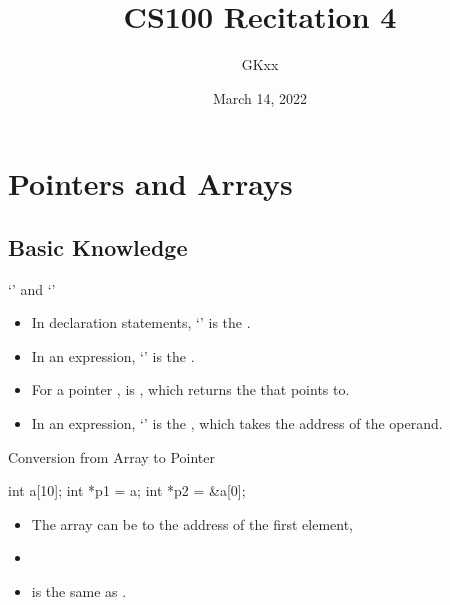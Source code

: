 \documentclass[handout]{beamer}
\title{CS100 Recitation 4}
\author{GKxx}
\date{March 14, 2022}
\begin{document}
\begin{frame}
    \maketitle
\end{frame}


\section{Pointers and Arrays}

\subsection{Basic Knowledge}

\begin{frame}{`\ttt{*}' and `\ttt{\&}'}
    \begin{itemize}
        \item In declaration statements, `\ttt{*}' is the .
        \item In an expression, `\ttt{*}' is the .
        \item For a pointer ,  is , which returns the  that  points to.
        \item In an expression, `\ttt{\&}' is the , which takes the address of the operand.
    \end{itemize}
\end{frame}

\begin{frame}[fragile]{Conversion from Array to Pointer}
    \begin{cpp}
int a[10];
int *p1 = a;
int *p2 = &a[0];
    \end{cpp}
    \begin{itemize}
        \item The array can be  to the address of the first element,
        \item {}
        \pause
        \item {} is the same as .
    \end{itemize}
\end{frame}
\end{document}
